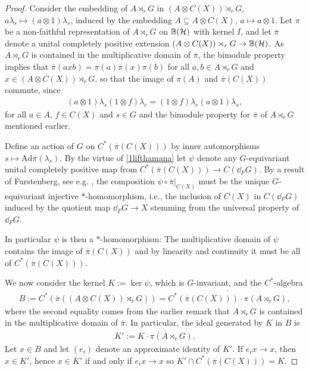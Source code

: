 \begin{proof}
	Consider the embedding of $A \rtimes_r G$ in $(A \otimes C(X)) \rtimes_r G$,  $a \lambda_s \mapsto (a \otimes 1) \lambda_s$, induced by the embedding $A \subseteq A \otimes C(X)$, $a \mapsto a \otimes 1$. Let $\pi$ be a non-faithful representation of $A \rtimes_r G$ on $\mathbb{B}(\mathcal{H})$ with kernel $I$, and let $\overline \pi$ denote a unital completely positive extension $(A \otimes C(X)) \rtimes_r G \to \mathbb{B}(\mathcal{H})$. As $A \rtimes_r G$ is contained in the multiplicative domain of $\overline \pi$, the bimodule property implies that $\overline \pi(axb) = \pi(a) \overline \pi(x) \pi(b)$ for all $a,b \in A \rtimes_r G$ and $x \in (A \otimes C(X)) \rtimes_r G$, so that the image of $\pi(A)$ and $\overline \pi(C(X))$ commute, since
	\begin{align*}
		(a \otimes 1 )\lambda_s (1 \otimes f ) \lambda_e = (1 \otimes f) \lambda_e (a \otimes 1) \lambda_s,
	\end{align*}
	for all $ a \in A$, $f \in C(X)$ and $s \in G$ and the bimodule property for $\overline \pi$ of $A \rtimes_r G$ mentioned earlier. 

	Define an action of $G$ on $C^*(\overline \pi(C(X)))$ by inner automorphisms $s \mapsto \mathrm{Ad} \overline \pi(\lambda_s)$. By the virtue of \cref{1lifthamana} let $\psi$ denote any $G$-equivariant unital completely positive map from $C^*(\overline \pi (C(X))) \to C(\dd_F G)$. By a result of Furstenberg, see e.g. \cite[lemma 4.16]{bscp}, the composition $\psi \circ \overline \pi|_{C(X)}$ must be the unique $G$-equivariant injective $*$-homomorphism, i.e., the inclusion of $C(X)$ in $C(\dd_F G)$ induced by the quotient map $\dd_F G \to X$ stemming from the universal property of $\dd_F G$.

	In particular $\psi$ is then a $*$-homomorphism: The multiplicative domain of $\psi$ contains the image of $\overline \pi(C(X))$ and by linearity and continuity it must be all of $C^*(\overline \pi (C(X)))$. 

	We now consider the kernel $K := \ker \psi$, which is $G$-invariant, and the $C^*$-algebra
	\begin{align*}
		B := C^*(\overline \pi ( ( A \otimes C(X)) \rtimes_r G)) = \overline{ C^*(\overline \pi(C(X))) \cdot \pi(A \rtimes_r G)},
	\end{align*}
	where the second equality comes from the earlier remark that $A \rtimes_r G$ is contained in the multiplicative domain of $\overline \pi$. In particular, the ideal generated by $K$ in $B$ is
	\begin{align*}
		K' :=\overline{K \cdot \pi(A \rtimes_r G)}.
	\end{align*}
	Let $x \in B$ and let $(e_i)$ denote an approximate identity of $K'$. If $e_i x \to x$, then $x \in K'$, hence $x \in K'$ if and only if $e_i x\to x$ so $K' \cap C^*(\overline \pi(C(X))) = K$. 
	

\end{proof}
